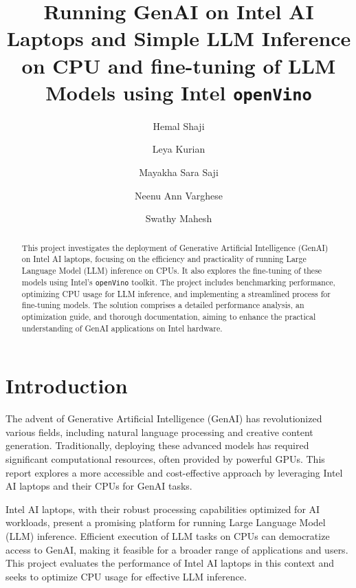 \documentclass{josis}
\begin{document}


\title{Running GenAI on Intel AI Laptops and Simple LLM Inference on CPU and fine-tuning of LLM Models using Intel \texttt{openVino}}

\author{Hemal Shaji}
\author{Leya Kurian}
\author{Mayakha Sara Saji }
\author{Neenu Ann Varghese}
\author{Swathy Mahesh}
\date{}
\maketitle
\begin{abstract}
This project investigates the deployment of Generative Artificial Intelligence (GenAI) on Intel AI laptops, focusing on the efficiency and practicality of running Large Language Model (LLM) inference on CPUs. It also explores the fine-tuning of these models using Intel's \texttt{openVino} toolkit. The project includes benchmarking performance, optimizing CPU usage for LLM inference, and implementing a streamlined process for fine-tuning models. The solution comprises a detailed performance analysis, an optimization guide, and thorough documentation, aiming to enhance the practical understanding of GenAI applications on Intel hardware. 
\end{abstract}
\section{Introduction}
The advent of Generative Artificial Intelligence (GenAI) has revolutionized various fields, including natural language processing and creative content generation. Traditionally, deploying these advanced models has required significant computational resources, often provided by powerful GPUs. This report explores a more accessible and cost-effective approach by leveraging Intel AI laptops and their CPUs for GenAI tasks.

Intel AI laptops, with their robust processing capabilities optimized for AI workloads, present a promising platform for running Large Language Model (LLM) inference. Efficient execution of LLM tasks on CPUs can democratize access to GenAI, making it feasible for a broader range of applications and users. This project evaluates the performance of Intel AI laptops in this context and seeks to optimize CPU usage for effective LLM inference.
\end{document}
